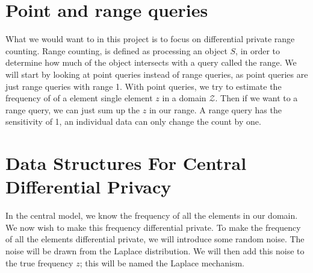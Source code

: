 \documentclass[11pt]{article}
\theoremstyle{definition}
\begin{document}
\section{Point and range queries}
What we would want to in this project is to focus on differential private range counting. Range counting, is defined as processing an object $S$, in order to determine how much of the object intersects with a query called the range. We will start by looking at point queries instead of range queries, as point queries are just range queries with range 1. With point queries, we try to estimate the frequency of of a element single element $z$ in a domain $\mathcal{Z}$. 
Then if we want to a range query, we can just sum up the $z$ in our range. A range query has the sensitivity of 1, an individual data can only change the count by one. 

\section{Data Structures For Central Differential Privacy}
In the central model, we know the frequency of all the elements in our domain. We now wish to make this frequency differential private. To make the frequency of all the elements differential private, we will introduce some random noise. The noise will be drawn from the Laplace distribution. We will then add this noise to the true frequency $z$; this will be named the Laplace mechanism.
\end{document}
